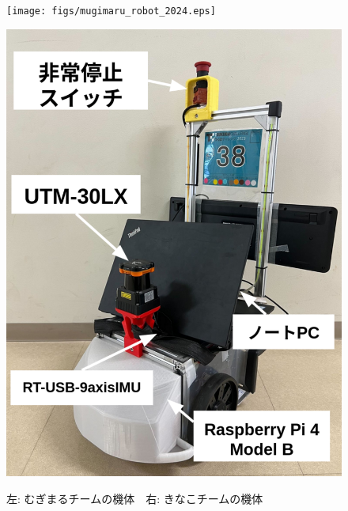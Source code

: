 \documentclass[twocolumn,9pt]{jsproceedings}
\begin{document}
\begin{figure}[H]
  \begin{minipage}[b]{0.48\columnwidth}
    \centering
    \texttt{[image: figs/mugimaru\_robot\_2024.eps]}
    \label{mugimaru_robot}
  \end{minipage}
  \begin{minipage}[b]{0.48\columnwidth}
    \centering
    \includegraphics[width=1.0\columnwidth]{figs/tama_robot.pdf}
    \label{kinako_robot}
  \end{minipage}
  \caption{左: むぎまるチームの機体　右: きなこチームの機体}
\end{figure}

\end{document}
